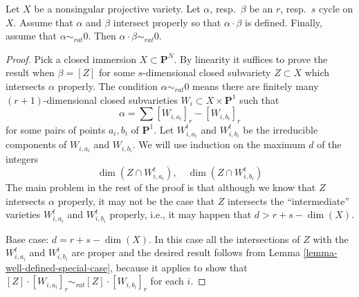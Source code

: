 \begin{theorem}
\label{theorem-well-defined}
Let $X$ be a nonsingular projective variety. Let $\alpha$, resp.\ $\beta$
be an $r$, resp.\ $s$ cycle on $X$. Assume that $\alpha$ and $\beta$
intersect properly so that $\alpha \cdot \beta$ is defined. Finally,
assume that $\alpha \sim_{rat} 0$. Then $\alpha \cdot \beta \sim_{rat} 0$.
\end{theorem}

\begin{proof}
Pick a closed immersion $X \subset \mathbf{P}^N$.
By linearity it suffices to prove the result when $\beta = [Z]$ for some
$s$-dimensional closed subvariety $Z \subset X$ which intersects $\alpha$
properly. The condition $\alpha \sim_{rat} 0$ means there
are finitely many $(r + 1)$-dimensional closed subvarieties
$W_i \subset X \times \mathbf{P}^1$ such that
$$
\alpha = \sum [W_{i, a_i}]_r - [W_{i, b_i}]_r
$$
for some pairs of points $a_i, b_i$ of $\mathbf{P}^1$.
Let $W_{i, a_i}^t$ and $W_{i, b_i}^t$ be the irreducible components
of $W_{i, a_i}$ and $W_{i, b_i}$.
We will use induction on the maximum $d$ of the integers
$$
\dim(Z \cap W_{i, a_i}^t),\quad \dim(Z \cap W_{i, b_i}^t)
$$
The main problem in the rest of the proof is that although we know that $Z$
intersects $\alpha$ properly, it may not be the case that $Z$ intersects the
``intermediate'' varieties $W_{i, a_i}^t$
and $W_{i, b_i}^t$ properly, i.e., it may happen that $d >  r + s - \dim(X)$.

\medskip\noindent
Base case: $d = r + s - \dim(X)$. In this case all the intersections of
$Z$ with the $W_{i, a_i}^t$ and $W_{i, b_i}^t$ are proper and the
desired result follows from Lemma \ref{lemma-well-defined-special-case},
because it applies to show that
$[Z] \cdot [W_{i, a_i}]_r \sim_{rat} [Z] \cdot [W_{i, b_i}]_r$ for
each $i$.


\end{proof}
